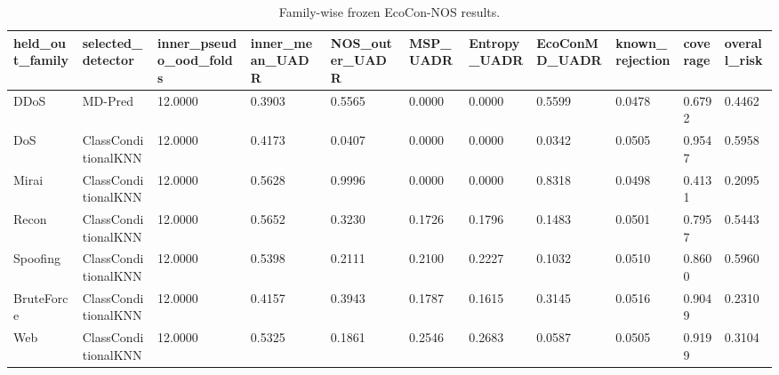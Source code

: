\begin{table}
\caption{Family-wise frozen EcoCon-NOS results.}
\label{tab:table06_family_results}
\begin{tabular}{lllllllllll}
\toprule
held\_out\_family & selected\_detector & inner\_pseudo\_ood\_folds & inner\_mean\_UADR & NOS\_outer\_UADR & MSP\_UADR & Entropy\_UADR & EcoConMD\_UADR & known\_rejection & coverage & overall\_risk \\
\midrule
DDoS & MD-Pred & 12.0000 & 0.3903 & 0.5565 & 0.0000 & 0.0000 & 0.5599 & 0.0478 & 0.6792 & 0.4462 \\
DoS & ClassConditionalKNN & 12.0000 & 0.4173 & 0.0407 & 0.0000 & 0.0000 & 0.0342 & 0.0505 & 0.9547 & 0.5958 \\
Mirai & ClassConditionalKNN & 12.0000 & 0.5628 & 0.9996 & 0.0000 & 0.0000 & 0.8318 & 0.0498 & 0.4131 & 0.2095 \\
Recon & ClassConditionalKNN & 12.0000 & 0.5652 & 0.3230 & 0.1726 & 0.1796 & 0.1483 & 0.0501 & 0.7957 & 0.5443 \\
Spoofing & ClassConditionalKNN & 12.0000 & 0.5398 & 0.2111 & 0.2100 & 0.2227 & 0.1032 & 0.0510 & 0.8600 & 0.5960 \\
BruteForce & ClassConditionalKNN & 12.0000 & 0.4157 & 0.3943 & 0.1787 & 0.1615 & 0.3145 & 0.0516 & 0.9049 & 0.2310 \\
Web & ClassConditionalKNN & 12.0000 & 0.5325 & 0.1861 & 0.2546 & 0.2683 & 0.0587 & 0.0505 & 0.9199 & 0.3104 \\
\bottomrule
\end{tabular}
\end{table}
